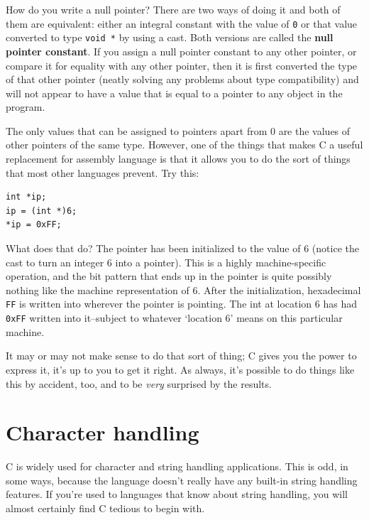    How do you write a null pointer? There are two ways of doing it and
    both of them are equivalent: either an integral constant with the value
    of \texttt{0} or that value converted to type \texttt{void *} by
    using a cast. Both versions are called the \textbf{null pointer
    constant}. If you assign a null pointer constant to any other
    pointer, or compare it for equality with any other pointer, then it is
    first converted the type of that other pointer (neatly solving any
    problems about type compatibility) and will not appear to have a value
    that is equal to a pointer to any object in the program.


   The only values that can be assigned to pointers apart from 0 are the
    values of other pointers of the same type. However, one of the things
    that makes C a useful replacement for assembly language is that it
    allows you to do the sort of things that most other languages prevent.
    Try this:


   \begin{Verbatim}
int *ip;
ip = (int *)6;
*ip = 0xFF;
\end{Verbatim}

   What does that do? The pointer has been initialized to the value of
    6 (notice the cast to turn an integer 6 into a pointer). This is
    a highly machine-specific operation, and the bit pattern that ends up in
    the pointer is quite possibly nothing like the machine representation of
    6.  After the initialization, hexadecimal \texttt{FF} is written into
    wherever the pointer is pointing. The int at location 6 has had
    \texttt{0xFF} written into it--subject to whatever
    `location 6' means on this particular machine.


   It may or may not make sense to do that sort of thing; C gives you the
    power to express it, it's up to you to get it right. As always, it's
    possible to do things like this by accident, too, and to be
    \textit{very} surprised by the results.


  

 
        \section{Character handling}
        

  

  C is widely used for character and string handling applications. This
   is odd, in some ways, because the language doesn't really have any
   built-in string handling features. If you're used to languages that know
   about string handling, you will almost certainly find C tedious to begin
   with.



